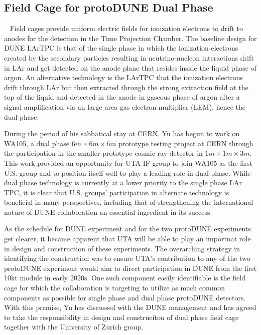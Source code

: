 \subsection{Field Cage for protoDUNE Dual Phase}~\label{section:proto-dune-dp-fc}
Field cages provide uniform electric fields for ionization electrons to drift to anodes for the detection in the Time Projection Chamber.
The baseline design for DUNE LArTPC is that of the single phase in which the ionization electrons created by the secondary particles 
resulting in neutrino-nucleon interactions drift in LAr and get detected on the anode plane that resides inside the liquid phase of argon.  An alternative technology is the LArTPC that the ionization electrons drift through LAr but then extracted through the strong extraction field at the top of the liquid and detected in the anode in gaseous phase of argon after a signal amplification via an large area gas electron multiplier (LEM), hence the dual phase.

During the period of his sabbatical stay at CERN, Yu has begun to work on WA105, a dual phase $6m\times 6m\times 6m$ prototype testing project at CERN through the participation in the smaller prototype cosmic ray detector in $1m\times 1m\times 3m$.  This work provided an opportunity for UTA IF group to join WA105 as the first U.S. group and to position itself well to play a leading role in dual phase.   While dual phase technology is currently at a lower priority to the single phase LAr TPC, it is clear that U.S. groups' participation in alternate technology is beneficial in many perspectives, including that of strengthening the international nature of DUNE collaboration an essential ingredient in its success.

As the schedule for DUNE experiment and for the two protoDUNE experiments get clearer, it became apparent that UTA will be able to play an importnat role in design and construction of these experiments.   The overarching strategy in identifying the construction was to ensure UTA's contribution to any of the two protoDUNE experiment would aim to direct participation in DUNE from the first 10kt module in early 2020s.  One such component easily identifiable is the field cage for which the collaboration is targeting to utilize as much common components as possible for single phase and dual phase protoDUNE detectors.    With this premise, Yu has discussed with the DUNE management and has agreed to take the responsibility in design and construciton of dual phase field cage together with the University of Zurich group.    


